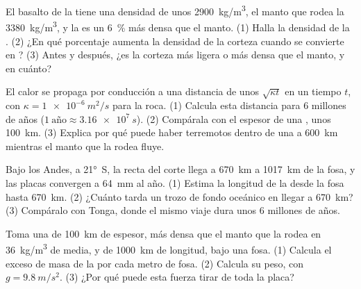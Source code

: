 \begin{exercise}[$\star\star$]\label{exo:g11:subduction-zones:11}
El basalto de la  tiene una densidad de unos
\qty{2900}{kg/m^3}, el manto que rodea la  \qty{3380}{kg/m^3}, y la
 es un \qty{6}{\percent} más densa que el manto. (1) Halla la densidad
de la . (2) ¿En qué porcentaje aumenta la densidad de la corteza
cuando se convierte en ? (3) Antes y después, ¿es la corteza más
ligera o más densa que el manto, y en cuánto?
\end{exercise}

\begin{exercise}[$\star\star\star$]\label{exo:g11:subduction-zones:12}
El calor se propaga por conducción a una distancia de unos $\sqrt{\kappa t}$
en un tiempo $t$, con $\kappa = \qty{1e-6}{m^2/s}$ para la roca. (1) Calcula
esta distancia para 6 millones de años ($1~\text{año} \approx \qty{3.16e7}{s}$).
(2) Compárala con el espesor de una , unos \qty{100}{km}. (3) Explica por
qué puede haber terremotos dentro de una  a \qty{600}{km} mientras el
manto que la rodea fluye.
\end{exercise}

\begin{exercise}[$\star\star\star$]\label{exo:g11:subduction-zones:13}
Bajo los Andes, a \ang{21}~S, la recta del corte llega a \qty{670}{km} a
\qty{1017}{km} de la fosa, y las placas convergen a \qty{64}{mm} al año.
(1) Estima la longitud de la  desde la fosa hasta \qty{670}{km}.
(2) ¿Cuánto tarda un trozo de fondo oceánico en llegar a \qty{670}{km}?
(3) Compáralo con Tonga, donde el mismo viaje dura unos 6 millones de años.
\end{exercise}

\begin{exercise}[$\star\star\star$]\label{exo:g11:subduction-zones:14}
Toma una  de \qty{100}{km} de espesor, más densa que el manto que la rodea
en \qty{36}{kg/m^3} de media, y de \qty{1000}{km} de longitud, bajo una fosa.
(1) Calcula el exceso de masa de la  por cada metro de fosa. (2) Calcula
su peso, con $g = \qty{9.8}{m/s^2}$. (3) ¿Por qué puede esta fuerza tirar de
toda la placa?
\end{exercise}

